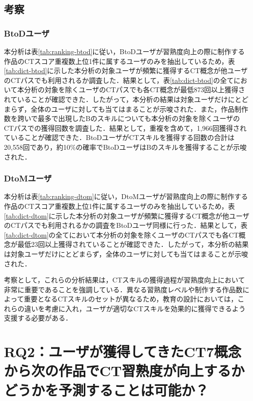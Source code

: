 \documentclass[11pt,dvipdfmx]{jreport}
\begin{document}
\section{考察}

\subsection*{BtoDユーザ}

本分析は表\ref{tab:ranking-btod}に従い，BtoDユーザが習熟度向上の際に制作する作品のCTスコア重複数上位1件に属するユーザのみを抽出しているため，表\ref{tab:dict-btod}に示した本分析の対象ユーザが頻繁に獲得するCT概念が他ユーザのCTパスでも利用されるか調査した．結果として，表\ref{tab:dict-btod}の全てにおいて本分析の対象を除くユーザのCTパスでも各CT概念が最低873回以上獲得されていることが確認できた．したがって，本分析の結果は対象ユーザだけにとどまらず，全体のユーザに対しても当てはまることが示唆された．また，作品制作数を跨いで最多で出現したBのスキルについても本分析の対象を除くユーザのCTパスでの獲得回数を調査した．結果として，重複を含めて，1,966回獲得されていることが確認できた．BtoDユーザがCTスキルを獲得する回数の合計は20,558回であり，約10\%の確率でBtoDユーザはBのスキルを獲得することが示唆された．

\subsection*{DtoMユーザ}

本分析は表\ref{tab:ranking-dtom}に従い，DtoMユーザが習熟度向上の際に制作する作品のCTスコア重複数上位1件に属するユーザのみを抽出しているため，表\ref{tab:dict-dtom}に示した本分析の対象ユーザが頻繁に獲得するCT概念が他ユーザのCTパスでも利用されるかの調査をBtoDユーザ同様に行った．結果として，表\ref{tab:dict-dtom}の全てにおいて本分析の対象を除くユーザのCTパスでも各CT概念が最低23回以上獲得されていることが確認できた．したがって，本分析の結果は対象ユーザだけにとどまらず，全体のユーザに対しても当てはまることが示唆された．

\vspace{5mm}


考察として，これらの分析結果は，CTスキルの獲得過程が習熟度向上において非常に重要であることを強調している．異なる習熟度レベルや制作する作品数によって重要となるCTスキルのセットが異なるため，教育の設計においては，これらの違いを考慮に入れ，ユーザが適切なCTスキルを効果的に獲得できるよう支援する必要がある．

\chapter{RQ2：ユーザが獲得してきたCT7概念から次の作品でCT習熟度が向上するかどうかを予測することは可能か？}
\end{document}
